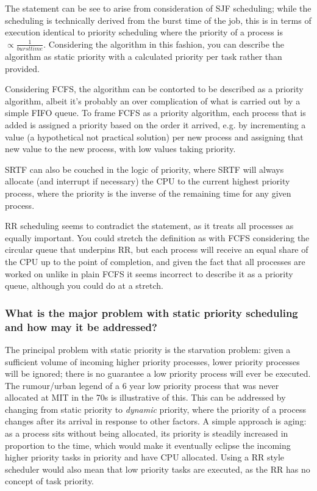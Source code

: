 \documentclass[]{article}
\begin{document}
        The statement can be see to arise from consideration of SJF scheduling; while the scheduling is technically derived from the burst time of the job, this is in terms of execution identical to priority scheduling where the priority of a process is $\propto \frac{1}{burst time}$. Considering the algorithm in this fashion, you can describe the algorithm as static priority with a calculated priority per task rather than provided.

        Considering FCFS, the algorithm can be contorted to be described as a priority algorithm, albeit it's probably an over complication of what is carried out by a simple FIFO queue. To frame FCFS as a priority algorithm, each process that is added is assigned a priority based on the order it arrived, e.g. by incrementing a value (a hypothetical not practical solution) per new process and assigning that new value to the new process, with low values taking priority.

        SRTF can also be couched in the logic of priority, where SRTF will always allocate (and interrupt if necessary) the CPU to the current highest priority process, where the priority is the inverse of the remaining time for any given process.

        RR scheduling seems to contradict the statement, as it treats all processes as equally important. You could stretch the definition as with FCFS considering the circular queue that underpins RR, but each process will receive an equal share of the CPU up to the point of completion, and given the fact that all processes are worked on unlike in plain FCFS it seems incorrect to describe it as a priority queue, although you could do at a stretch.

        \subsubsection{What is the major problem with static priority scheduling and how may it be addressed?}

        The principal problem with static priority is the starvation problem: given a sufficient volume of incoming higher priority processes, lower priority processes will be ignored; there is no guarantee a low priority process will ever be executed. The rumour/urban legend of a 6 year low priority process that was never allocated at MIT in the 70s is illustrative of this. This can be addressed by changing from static priority to \textit{dynamic} priority, where the priority of a process changes after its arrival in response to other factors. A simple approach is aging: as a process sits without being allocated, its priority is steadily increased in proportion to the time, which would make it eventually eclipse the incoming higher priority tasks in priority and have CPU allocated. Using a RR style scheduler would also mean that low priority tasks are executed, as the RR has no concept of task priority.
\end{document}
